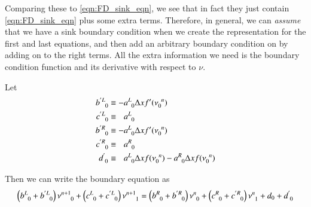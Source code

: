 \documentclass[letterpaper,12pt]{article}
\newcommand \bcf{f}
\begin{document}
Comparing these to \ref{eqn:FD_sink_eqn}, we see that in fact they just contain \ref{eqn:FD_sink_eqn} plus some extra terms. Therefore, in general,
we can \emph{assume} that we have a sink boundary condition when we create the representation for the first and last equations, and then add an arbitrary
boundary condition on by adding on to the right terms. All the extra information we need is the boundary condition function and its derivative with
respect to $\nu$.

Let
\begin{align}
  b\indices{^{'L}_0} &\equiv          - a\indices{^L_0} \Delta x \bcf'(\nu\indices{_0^n}) \\
  c\indices{^{'L}_0} &\equiv \phantom{-}a\indices{^L_0} \\
  b\indices{^{'R}_0} &\equiv          - a\indices{^L_0} \Delta x \bcf'(\nu\indices{_0^n}) \\
  c\indices{^{'R}_0} &\equiv \phantom{-}a\indices{^R_0} \\
  d\indices{^{' }_0} &\equiv \phantom{-}a\indices{^L_0} \Delta x \bcf (\nu\indices{_0^n}) - a\indices{^R_0} \Delta x \bcf (\nu\indices{_0^n})
\end{align}

Then we can write the boundary equation as
\begin{equation}
  \left( b\indices{^L_0} + b\indices{^{'L}_0} \right) \nu\indices{^{n+1}_{0}}
+ \left( c\indices{^L_0} + c\indices{^{'L}_0} \right) \nu\indices{^{n+1}_{1}}
=
  \left( b\indices{^R_0} + b\indices{^{'R}_0} \right) \nu\indices{^{n  }_{0}}
+ \left( c\indices{^R_0} + c\indices{^{'R}_0} \right) \nu\indices{^{n  }_{1}}
+ d_0 + d\indices{^'_0}
\end{equation}
\end{document}
